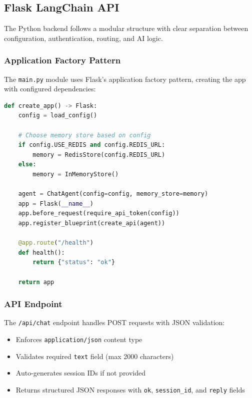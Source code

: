 \documentclass[a4paper]{article}
\begin{document}
\subsection{Flask LangChain API}

The Python backend follows a modular structure with clear separation between configuration, authentication, routing, and AI logic.

\subsubsection{Application Factory Pattern}

The \texttt{main.py} module uses Flask's application factory pattern, creating the app with configured dependencies:

\begin{lstlisting}[language=Python, caption={Flask application factory in main.py}, label=lst:flask-factory]
def create_app() -> Flask:
    config = load_config()
    
    # Choose memory store based on config
    if config.USE_REDIS and config.REDIS_URL:
        memory = RedisStore(config.REDIS_URL)
    else:
        memory = InMemoryStore()

    agent = ChatAgent(config=config, memory_store=memory)
    app = Flask(__name__)
    app.before_request(require_api_token(config))
    app.register_blueprint(create_api(agent))
    
    @app.route("/health")
    def health():
        return {"status": "ok"}

    return app
\end{lstlisting}

\subsubsection{API Endpoint}

The \texttt{/api/chat} endpoint handles POST requests with JSON validation:

\begin{itemize}[noitemsep]
    \item Enforces \texttt{application/json} content type
    \item Validates required \texttt{text} field (max 2000 characters)
    \item Auto-generates session IDs if not provided
    \item Returns structured JSON responses with \texttt{ok}, \texttt{session\_id}, and \texttt{reply} fields
\end{itemize}
\end{document}
